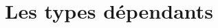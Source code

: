 \documentclass {article}
\theoremstyle{definition}
\theoremstyle{remark}
\begin{document}
\section{Les types dépendants}







\end{document}
